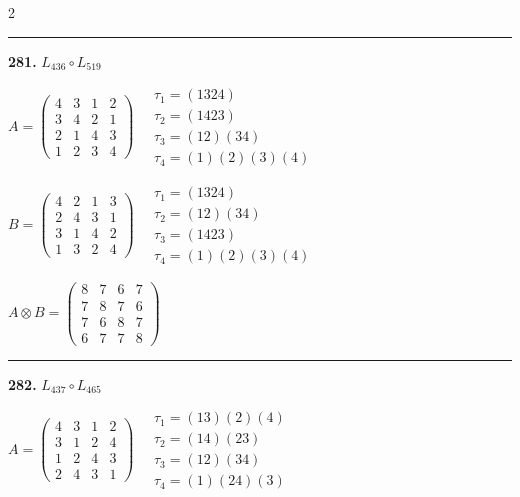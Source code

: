 \begin{multicols}{2}
\vspace{0.3em}
\hrule
\vspace{0.3em}

\noindent\textbf{281.} $L_{436} \circ L_{519}$

$A = \begin{pmatrix} 4 & 3 & 1 & 2 \\ 3 & 4 & 2 & 1 \\ 2 & 1 & 4 & 3 \\ 1 & 2 & 3 & 4 \end{pmatrix} \quad \begin{matrix} \tau_{1}=(1 3 2 4) \\ \tau_{2}=(1 4 2 3) \\ \tau_{3}=(1 2)(3 4) \\ \tau_{4}=(1)(2)(3)(4) \end{matrix}$

$B = \begin{pmatrix} 4 & 2 & 1 & 3 \\ 2 & 4 & 3 & 1 \\ 3 & 1 & 4 & 2 \\ 1 & 3 & 2 & 4 \end{pmatrix} \quad \begin{matrix} \tau_{1}=(1 3 2 4) \\ \tau_{2}=(1 2)(3 4) \\ \tau_{3}=(1 4 2 3) \\ \tau_{4}=(1)(2)(3)(4) \end{matrix}$

$A \otimes B = \begin{pmatrix} 8 & 7 & 6 & 7 \\ 7 & 8 & 7 & 6 \\ 7 & 6 & 8 & 7 \\ 6 & 7 & 7 & 8 \end{pmatrix}$

\vspace{0.3em}
\hrule
\vspace{0.3em}

\noindent\textbf{282.} $L_{437} \circ L_{465}$

$A = \begin{pmatrix} 4 & 3 & 1 & 2 \\ 3 & 1 & 2 & 4 \\ 1 & 2 & 4 & 3 \\ 2 & 4 & 3 & 1 \end{pmatrix} \quad \begin{matrix} \tau_{1}=(1 3)(2)(4) \\ \tau_{2}=(1 4)(2 3) \\ \tau_{3}=(1 2)(3 4) \\ \tau_{4}=(1)(2 4)(3) \end{matrix}$


\end{multicols}

